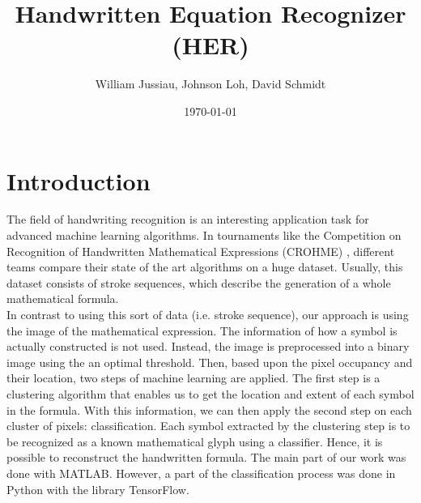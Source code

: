 \documentclass[twocolumn]{article}%
\title{Handwritten Equation Recognizer (HER)}
\author{William Jussiau, Johnson Loh, David Schmidt}
\date{\today}
\begin{document}


 

	
	\section{Introduction}
		The field of handwriting recognition is an interesting application task for advanced machine learning algorithms. In tournaments like the Competition on Recognition of Handwritten Mathematical Expressions (CROHME) \cite{crohme}, different teams compare their state of the art algorithms on a huge dataset. Usually, this dataset consists of stroke sequences, which describe the generation of a whole mathematical formula.\\
		In contrast to using this sort of data (i.e. stroke sequence), our approach is using the image of the mathematical expression. The information of how a symbol is actually constructed is not used. Instead, the image is preprocessed into a binary image using the an optimal threshold. Then, based upon the pixel occupancy and their location, two steps of machine learning are applied. The first step is a clustering algorithm that enables us to get the location and extent of each symbol in the formula. With this information, we can then apply the second step on each cluster of pixels: classification. Each symbol extracted by the clustering step is to be recognized as a known mathematical glyph using a classifier.  Hence, it is possible to reconstruct the handwritten formula.
		The main part of our work was done with MATLAB. However, a part of the classification process was done in Python with the library TensorFlow.
	    	    
\end{document}
